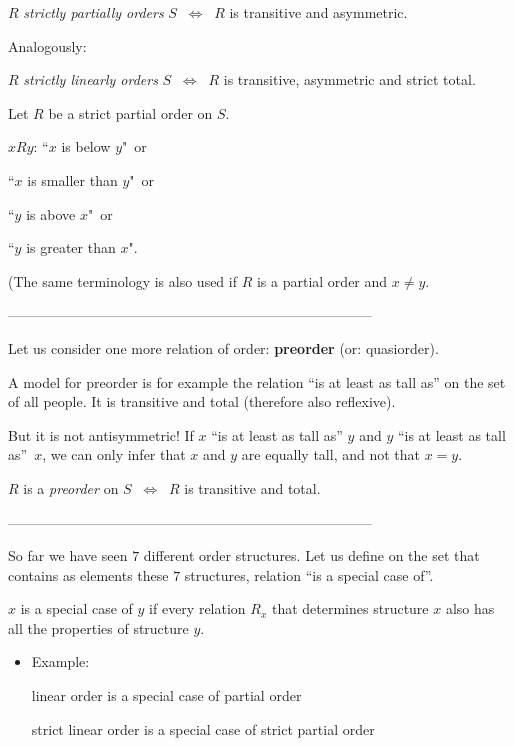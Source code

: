\documentclass[11pt,paper=b5,footinclude,headinclude]{scrbook} %
\def\cee {{~\Leftrightarrow~}}
\theoremstyle{remark}
\theoremstyle{definition} %
\theoremstyle{theorem} %
\begin{document}
$R$ {\em strictly partially orders} $S$ $\cee$ $R$ is transitive and asymmetric.

\bigskip

Analogously:

\medskip
$R$ {\em strictly linearly orders} $S$ $\cee$ $R$ is transitive, asymmetric and strict total.

\bigskip

Let $R$ be a strict partial order on $S$.

$xRy$: ``$x$ is below $y$"~or

``$x$ is smaller than $y$"~or

``$y$ is above $x$"~or

``$y$ is greater than $x$".

(The same terminology is also used if $R$ is a partial order and $x\neq y$.

------------------------------------------------------------------------------

\bigskip

Let us consider one more relation of order: \textbf{ preorder} (or: quasiorder).

A model for preorder is for example the relation ``is at least as tall as'' on the set of all people.
It is transitive and total (therefore also reflexive).

But it is not antisymmetric!
If $x$ ``is at least as tall as'' $y$ and $y$ ``is at least as tall as''~$x$,
we can only infer that $x$ and $y$ are equally tall, and not that $x = y$.

$R$ is a {\em preorder} on $S$ $\cee$ $R$ is transitive and total.

\bigskip

------------------------------------------------------------------------------
\bigskip

So far we have seen $7$ different order structures.
Let us define on the set that contains as elements these $7$
structures, relation ``is a special case of''.

$x$ is a special case of $y$ if every relation $R_x$ that determines structure $x$
also has all the properties of structure $y$.

\begin{itemize}
  \item Example:

  linear order is a special case of partial order

  strict linear order is a special case of strict partial order
\end{itemize}
\end{document}
